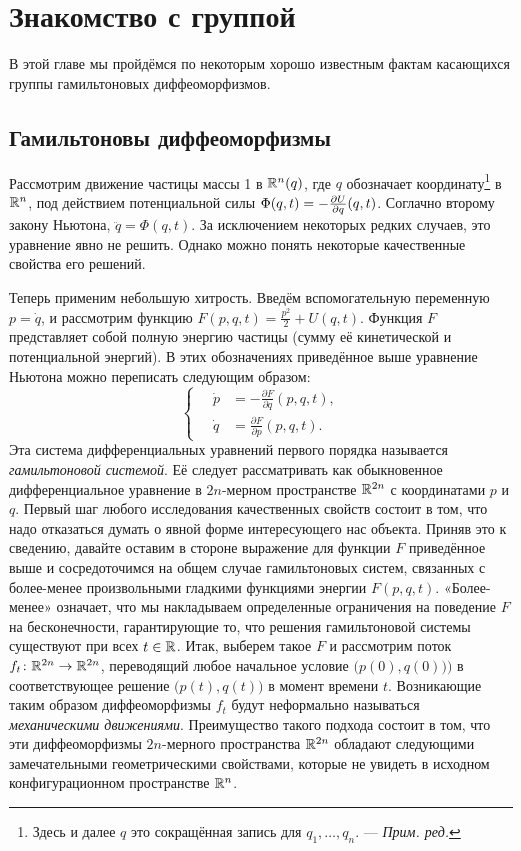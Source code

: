 \chapter{Знакомство с группой}\label{chap:1}

В этой главе мы пройдёмся по некоторым хорошо известным фактам касающихся группы гамильтоновых диффеоморфизмов.

\section[Гамильтоновы диффеоморфизмы]{Гамильтоновы диффеоморфизмы}

Рассмотрим движение частицы массы 1 в $\mathbb{R}^n(q)$, где $q$ обозначает координату\footnote{Здесь и далее  $q$ это сокращённая запись для $q_1,\dots,q_n$. — \textit{Прим. ред.}} в $\mathbb{R}^n$, под действием потенциальной силы $\Phi(q, t)  \z= - \tfrac{\partial U}{\partial q} (q, t)$.
Соглачно второму закону Ньютона, $\ddot q= \Phi (q, t)$.
За исключением некоторых редких случаев, это уравнение явно не решить.
Однако можно понять некоторые качественные свойства его решений.

Теперь применим небольшую хитрость.
Введём вспомогательную переменную $p = \dot q$, и рассмотрим функцию $F(p,q,t)= \tfrac {p^2} 2 + U (q, t)$.
Функция $F$ представляет собой полную энергию частицы (сумму её кинетической и потенциальной энергий).
В этих обозначениях приведённое выше уравнение Ньютона можно переписать следующим образом:
\[
\begin{cases}
\quad\dot p &= - \tfrac{\partial F}{\partial q} (p, q, t),\\
\quad\dot q &= \tfrac{\partial F}{\partial p} (p, q, t).
\end{cases}
\]
Эта система дифференциальных уравнений первого порядка называется \emph{гамильтоновой системой}.
Её следует рассматривать как обыкновенное дифференциальное уравнение в $2n$-мерном пространстве $\mathbb{R}^{2n}$ с координатами $p$ и $q$.
Первый шаг любого исследования качественных свойств состоит в том, что надо отказаться думать о явной форме интересующего нас объекта.
Приняв это к сведению, давайте оставим в стороне выражение для функции
$F$ приведённое выше
и сосредоточимся на общем случае гамильтоновых систем, связанных с более-менее произвольными гладкими функциями энергии $F (p, q, t)$.
«Более-менее» означает, что мы накладываем определенные ограничения на поведение $F$ на бесконечности, гарантирующие то, что решения гамильтоновой системы существуют при всех $t\in \mathbb{R}$.
Итак, выберем такое $F$ и рассмотрим поток $f_t\colon \mathbb{R}^{2n} \to \mathbb{R}^{2n}$, переводящий любое начальное условие $\big(p(0),q(0)\big))$ в соответствующее решение $\big(p (t), q (t)\big)$ в момент времени $t$.
Возникающие таким образом диффеоморфизмы $f_t$ будут неформально называться \emph{механическими движениями}.
Преимущество такого подхода состоит в том, что эти диффеоморфизмы $2n$-мерного пространства $\mathbb{R}^{2n}$ обладают следующими замечательными геометрическими свойствами, которые не увидеть в исходном конфигурационном пространстве $\mathbb{R}^n$.

